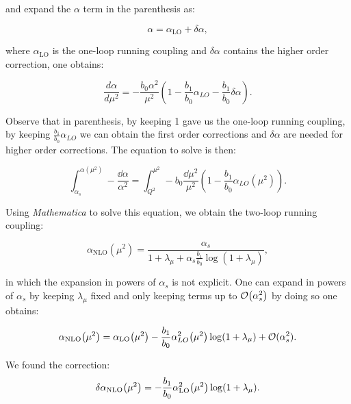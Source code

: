 \documentclass[../Tesi_Jiahao_Miao_986136.tex]{subfiles}
\begin{document}
and expand the $\alpha$ term in the parenthesis as:

\begin{equation}
    \alpha = \alpha_{\text{LO}} + \delta \alpha,
\end{equation}

where $\alpha_{\text{LO}}$ is the one-loop running coupling and $\delta\alpha$ contains the higher order correction, one obtains:

\begin{equation}
    \frac{d\alpha}{d\mu^2} = - \frac{b_0 \alpha^2}{\mu^2} ( 1 - \frac{b_1}{b_0} \alpha_{LO} - \frac{b_1}{b_0} \delta\alpha).
\end{equation}

Observe that in parenthesis, by keeping 1 gave us the one-loop running coupling, by keeping $\frac{b_1}{b_0} \alpha_{LO}$ we can obtain the first order corrections
and $\delta\alpha$ are needed for higher order corrections. The equation to solve is then:

\begin{equation}
    \int_{\alpha_s}^{\alpha(\mu^2)} -\frac{\dd\alpha}{\alpha^2} = 
    \int _{Q^2}^{\mu^2} - b_0 \frac{ \dd\mu^2}{\mu^2} ( 1 - \frac{b_1}{b_0} \alpha_{LO}(\mu^2) ).
\end{equation}

Using \emph{Mathematica} \cite{Mathematica} to solve this equation, we obtain the two-loop running coupling:

\begin{equation}
    \alpha_{\text{NLO}}(\mu^2) = \frac{\alpha_s}{1+\lambda_\mu + \alpha_s \frac{b_1}{b_0} \log(1+\lambda_\mu)},
\end{equation}

in which the expansion in powers of $\alpha_s$ is not explicit. One can expand 
in powers of $\alpha_s$ by keeping $\lambda_\mu$ fixed and only keeping terms up to 
$\order{\alpha_s^2}$ by doing so one obtains:

\begin{equation}\label{eq:NLO}
    \alpha_{\text{NLO}}\qty(\mu^2) = \alpha_{\text{LO}}\qty(\mu^2) -\frac{b_1}{b_0} \alpha_{LO}^2\qty(\mu^2) \log(1+\lambda_\mu) + \mathcal{O}(\alpha_s^2) .
\end{equation}

We found the correction: 
\begin{equation}\label{eq:DNLO}
\delta\alpha_{\text{NLO}}\qty(\mu^2) = -\frac{b_1}{b_0} \alpha_{\text{LO}}^2\qty(\mu^2) \log(1+\lambda_\mu) .
\end{equation}
\end{document}

